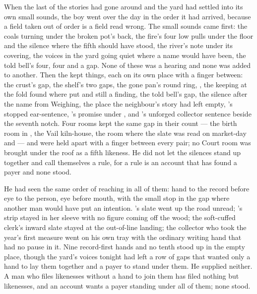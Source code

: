 When the last of the stories had gone around and the yard had settled into its own small sounds, the boy went over the day in the order it had arrived, because a field taken out of order is a field read wrong. The small sounds came first: the coals turning under the broken pot's back, the fire's four low pulls under the floor and the silence where the fifth should have stood, the river's note under its covering, the voices in the yard going quiet where a name would have been, the told bell's four, four and a gap. None of these was a hearing and none was added to another. Then the kept things, each on its own place with a finger between: the crust's gap, the shelf's two gaps, the gone pan's round ring, , the keeping at the fold found where put and still a finding, the told bell's gap, the silence after the name from Weighing, the place the neighbour's story had left empty, 's stopped ear-sentence, 's promise under , and 's unforged collector sentence beside the seventh notch. Four rooms kept the same gap in their count --- the birth room in , the Vail kiln-house, the room where the slate was read on market-day and  --- and were held apart with a finger between every pair; no Court room was brought under the roof as a fifth likeness. He did not let the silences stand up together and call themselves a rule, for a rule is an account that has found a payer and none stood.

He had seen the same order of reaching in all of them: hand to the record before eye to the person, eye before mouth, with the small stop in the gap where another man would have put an intention. 's slate went up the road unread; 's strip stayed in her sleeve with no figure coming off the wood; the soft-cuffed clerk's inward slate stayed at the out-of-line landing; the collector who took the year's first measure went on his own tray with the ordinary writing hand that had no pause in it. Nine record-first hands and no tenth stood up in the empty place, though the yard's voices tonight had left a row of gaps that wanted only a hand to lay them together and a payer to stand under them. He supplied neither. A man who files likenesses without a hand to join them has filed nothing but likenesses, and an account wants a payer standing under all of them; none stood.

